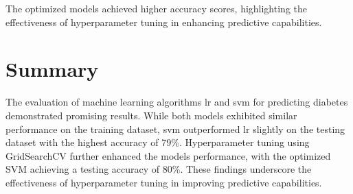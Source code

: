 The optimized models achieved higher accuracy scores, highlighting the effectiveness of hyperparameter tuning in enhancing predictive capabilities.

\section{Summary}
The evaluation of machine learning algorithms lr and svm for predicting diabetes demonstrated promising results. While both models exhibited similar performance on the training dataset, svm outperformed lr slightly on the testing dataset with the highest accuracy of 79\%. Hyperparameter tuning using GridSearchCV further enhanced the models performance, with the optimized SVM achieving a testing accuracy of 80\%. These findings underscore the effectiveness of hyperparameter tuning in improving predictive capabilities.



